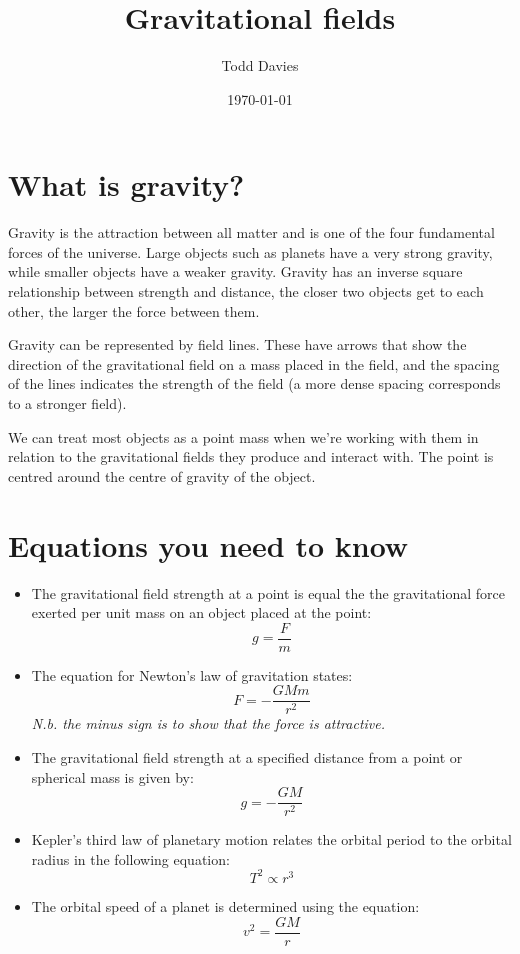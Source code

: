 \documentclass{article}
\title{Gravitational fields}
\author{Todd Davies}
\date{\today}
\begin{document}
\lhead{\today}

\maketitle

\section*{What is gravity?}
\thispagestyle{empty}
Gravity is the attraction between all matter and is one of the four fundamental
forces of the universe. Large objects such as planets have a very strong
gravity, while smaller objects have a weaker gravity. Gravity has an inverse
square relationship between strength and distance, the closer two objects get to
each other, the larger the force between them.

Gravity can be represented by field lines. These have arrows that show the
direction of the gravitational field on a mass placed in the field, and the
spacing of the lines indicates the strength of the field (a more dense spacing
corresponds to a stronger field).

We can treat most objects as a point mass when we're working with them in
relation to the gravitational fields they produce and interact with. The point
is centred around the centre of gravity of the object.


\section*{Equations you need to know}

\begin{itemize}
	\item The gravitational field strength at a point is equal the the
	gravitational force exerted per unit mass on an object placed at the point:
	\[
		g = \frac{F}{m}
	\]
	\item The equation for Newton's law of gravitation states:
	\[
		F = -\frac{GMm}{r^2}
	\]
	\textit{N.b. the minus sign is to show that the force is attractive.}
	\item The gravitational field strength at a specified distance from a point
	or spherical mass is given by:
	\[
		g = -\frac{GM}{r^2}
	\]
	\item Kepler's third law of planetary motion relates the orbital period to
	the orbital radius in the following equation:
	\[
		T^2 \propto r^3
	\]
	\item The orbital speed of a planet is determined using the equation:
	\[
		v^2 = \frac{GM}{r}
	\]
\end{itemize}
\end{document}

